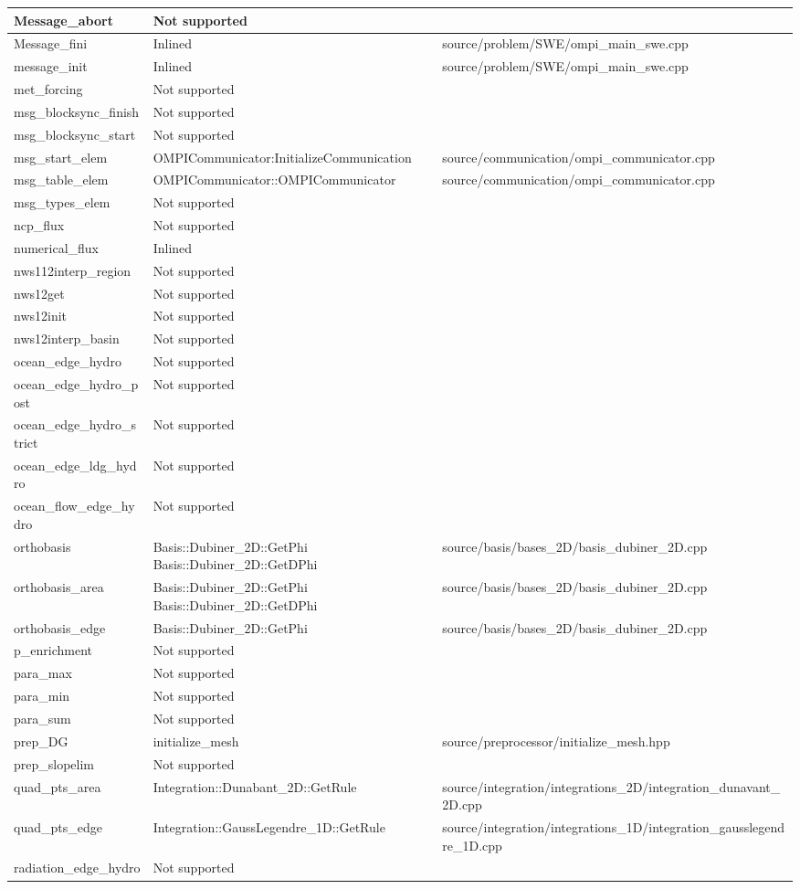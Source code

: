 {\begin{longtable}{ l | p{55mm} | p{86mm} }
\tabularnewline \hline
Message\_abort & Not supported	
\tabularnewline \hline
Message\_fini & Inlined & source/problem/SWE/ompi\_main\_swe.cpp
\tabularnewline \hline
message\_init & Inlined & source/problem/SWE/ompi\_main\_swe.cpp
\tabularnewline \hline
met\_forcing & Not supported	&
\tabularnewline \hline
msg\_blocksync\_finish & Not supported &	
\tabularnewline \hline
msg\_blocksync\_start & Not supported &
\tabularnewline \hline
msg\_start\_elem & OMPICommunicator:InitializeCommunication & source/communication/ompi\_communicator.cpp
\tabularnewline \hline
msg\_table\_elem & OMPICommunicator::OMPICommunicator & source/communication/ompi\_communicator.cpp
\tabularnewline \hline
msg\_types\_elem & Not supported &	
\tabularnewline \hline
ncp\_flux & Not supported &
\tabularnewline \hline
numerical\_flux & Inlined &	
\tabularnewline \hline
nws112interp\_region & Not supported	&
\tabularnewline \hline
nws12get & Not supported &
\tabularnewline \hline
nws12init & Not supported &
\tabularnewline \hline
nws12interp\_basin & Not supported &
\tabularnewline \hline
ocean\_edge\_hydro & Not supported &
\tabularnewline \hline
ocean\_edge\_hydro\_post & Not supported &
\tabularnewline \hline
ocean\_edge\_hydro\_strict	& Not supported &	
\tabularnewline \hline
ocean\_edge\_ldg\_hydro & Not supported &
\tabularnewline \hline
ocean\_flow\_edge\_hydro & Not supported &	
\tabularnewline \hline
orthobasis & Basis::Dubiner\_2D::GetPhi \newline Basis::Dubiner\_2D::GetDPhi &	source/basis/bases\_2D/basis\_dubiner\_2D.cpp
\tabularnewline \hline
orthobasis\_area & Basis::Dubiner\_2D::GetPhi \newline Basis::Dubiner\_2D::GetDPhi & source/basis/bases\_2D/basis\_dubiner\_2D.cpp
\tabularnewline \hline
orthobasis\_edge	& Basis::Dubiner\_2D::GetPhi & source/basis/bases\_2D/basis\_dubiner\_2D.cpp
\tabularnewline \hline
p\_enrichment & Not supported &
\tabularnewline \hline
para\_max & Not supported &	
\tabularnewline \hline
para\_min & Not supported &
\tabularnewline \hline
para\_sum & Not supported &	
\tabularnewline \hline
prep\_DG	& initialize\_mesh & source/preprocessor/initialize\_mesh.hpp
\tabularnewline \hline
prep\_slopelim & Not supported &	
\tabularnewline \hline
quad\_pts\_area & Integration::Dunabant\_2D::GetRule & 	source/integration/integrations\_2D/integration\_dunavant\_2D.cpp
\tabularnewline \hline
quad\_pts\_edge & Integration::GaussLegendre\_1D::GetRule & source/integration/integrations\_1D/integration\_gausslegendre\_1D.cpp
\tabularnewline \hline
radiation\_edge\_hydro & Not supported &

\end{longtable}}
